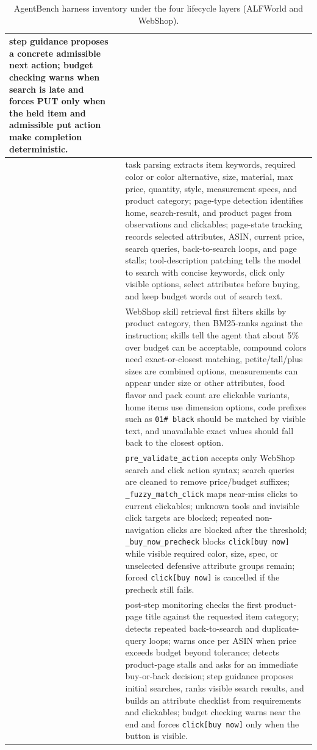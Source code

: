 \begin{table}[t]
\begin{tabular}{>{\centering\arraybackslash}m{}>{\centering\arraybackslash}m{}p{}}
step guidance proposes a concrete admissible next action; budget checking warns when
search is late and forces PUT only when the held item and admissible put action
make completion deterministic. \\
\midrule
\multirow{24}{*}{\centering WebShop}
& \multirow{5}{*}{Environment Contract Layer}
& task parsing extracts item keywords, required color or color
alternative, size, material, max price, quantity, style, measurement specs, and
product category; page-type detection identifies home, search-result, and product
pages from observations and clickables; page-state tracking records selected
attributes, ASIN, current price, search queries, back-to-search loops, and page
stalls; tool-description patching tells the model to search with concise
keywords, click only visible options, select attributes before buying, and keep
budget words out of search text. \\
\cmidrule(lr){2-3}
& \multirow{5}{*}{Procedural Skill Layer}
& WebShop skill retrieval first filters skills by product category, then
BM25-ranks against the instruction; skills tell the agent that about 5\% over
budget can be acceptable, compound colors need exact-or-closest matching,
petite/tall/plus sizes are combined options, measurements can appear under size
or other attributes, food flavor and pack count are clickable variants, home
items use dimension options, code prefixes such as \texttt{01\# black} should be
matched by visible text, and unavailable exact values should fall back to the
closest option. \\
\cmidrule(lr){2-3}
& \multirow{5}{*}{Action Realization Layer}
& \texttt{pre\_validate\_action} accepts only WebShop search and click action syntax;
search queries are cleaned to remove price/budget suffixes;
\texttt{\_fuzzy\_match\_click} maps near-miss clicks to current clickables; unknown tools and
invisible click targets are blocked; repeated non-navigation clicks are blocked
after the threshold; \texttt{\_buy\_now\_precheck} blocks \texttt{click[buy now]} while
visible required color, size, spec, or unselected defensive attribute groups
remain; forced \texttt{click[buy now]} is cancelled if the precheck still fails. \\
\cmidrule(lr){2-3}
& \multirow{5}{*}{Trajectory Regulation Layer}
& post-step monitoring checks the first product-page title against the requested item
category; detects repeated back-to-search and duplicate-query loops; warns once
per ASIN when price exceeds budget beyond tolerance; detects product-page stalls
and asks for an immediate buy-or-back decision; step guidance proposes initial
searches, ranks visible search results, and builds an attribute checklist from
requirements and clickables; budget checking warns near the end and forces
\texttt{click[buy now]} only when the button is visible. \\
\bottomrule
\end{tabular}
\caption{AgentBench harness inventory under the four lifecycle layers (ALFWorld and WebShop).}
\label{tab:agentbench-inventory}
\end{table}

